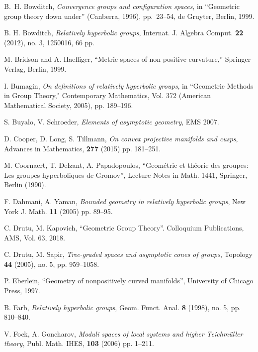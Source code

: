 \documentclass[12pt]{article}
\theoremstyle{boldplain}
\theoremstyle{bolddefinition}
\numberwithin{equation}{section}
\begin{document}
\begin{thebibliography}{BLP05}
B.\ H. Bowditch, 
{\em Convergence groups and configuration spaces}, 
in ``Geometric group theory down under'' (Canberra, 1996), 
pp.\ 23--54, de Gruyter, Berlin, 1999. 



B. H. Bowditch, {\em Relatively hyperbolic groups},  
Internat. J. Algebra Comput. {\bf 22} (2012), no. 3, 1250016, 66 pp.

M. Bridson and A. Haefliger, ``Metric spaces of non-positive curvature,'' Springer- Verlag, Berlin, 1999.

I. Bumagin, {\em On definitions of relatively hyperbolic groups}, in 
``Geometric Methods in Group Theory," Contemporary Mathematics, Vol. 372 (American Mathematical Society, 2005), pp. 189--196.  

S. Buyalo, V. Schroeder,
{\em Elements of asymptotic geometry}, 
EMS 2007.

D. Cooper, D. Long, S. Tillmann, {\em On convex projective manifolds and cusps}, 
Advances in Mathematics, {\bf 277} (2015) pp. 181--251. 

M. Coornaert, T. Delzant, A. Papadopoulos, ``Geom{\'e}trie et th{\'e}orie des groupes: 
Les groupes hyperboliques de Gromov'', 
Lecture Notes in Math. 1441, Springer, Berlin (1990). 

F. Dahmani,  A. Yaman, 
{\em Bounded geometry in relatively hyperbolic groups},  
New York J. Math. {\bf 11} (2005) pp. 89--95. 


      
C. Drutu, M. Kapovich, ``Geometric Group Theory''.  Colloquium Publications, AMS, Vol. 63, 2018.  
       
C. Drutu, M. Sapir, {\em Tree-graded spaces and asymptotic cones of groups}, Topology {\bf 44} (2005), no. 5, pp. 959--1058.       
       
P. Eberlein, ``Geometry of nonpositively curved manifolds'', University of Chicago Press, 1997. 

B. Farb, {\em Relatively hyperbolic groups}, Geom. Funct. Anal. {\bf 8} (1998), no. 5, pp. 810--840. 
       
V.  Fock, A. Goncharov, {\em Moduli spaces of local systems and higher Teichm\"uller theory}, 
Publ. Math. IHES, {\bf 103} (2006) pp. 1--211.    
       

\end{thebibliography}
\end{document}
